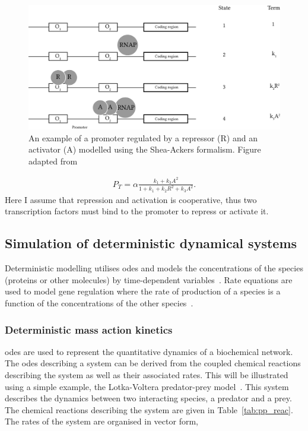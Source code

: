 \begin{figure}[htb]
\centerfloat
    \includegraphics[scale=0.8]{../../chapters/chapterBackgr/images/shea-ackers.png}
    \caption[Shea-Ackers formalism example]{An example of a promoter regulated by a repressor (R) and an activator (A) modelled using the Shea-Ackers formalism. Figure adapted from~\textcite{Woods:2016eh}}
    \label{fig:shea_ack_ex}
\end{figure}


\begin{align}
	P_{T} = \alpha \frac{k_1 + k_{3}A^2}{1 + k_1 + k_{2}R^2 + k_{3}A^2}.
\end{align}
Here I assume that repression and activation is cooperative, thus two transcription factors must bind to the promoter to repress or activate it. 
\newpage
\subsection{Simulation of deterministic dynamical systems}
Deterministic modelling utilises \acrfull{ode}s and models the concentrations of the species (proteins or other molecules) by time-dependent variables~\autocite{deJong:2002ft}. Rate equations are used to model gene regulation where the rate of production of a species is a function of the concentrations of the other species~\autocite{deJong:2002ft}. 

\subsubsection{Deterministic mass action kinetics}
\label{sec:predator_prey_odes}
\acrshort{ode}s are used to represent the quantitative dynamics of a biochemical network. The \acrshort{ode}s describing a system can be derived from the coupled chemical reactions describing the system as well as their associated rates. This will be illustrated using a simple example, the Lotka-Voltera predator-prey model~\autocite{lotka:voltera}. This system describes the dynamics between two interacting species, a predator and a prey. The chemical reactions describing the system are given in Table~\ref{tab:pp_reac}. The rates of the system are organised in vector form,


